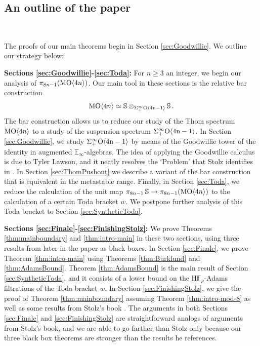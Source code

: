 \subsection{An outline of the paper}
\label{subsec:sketch}\ 

The proofs of our main theorems begin in Section \ref{sec:Goodwillie}.  We outline our strategy below:

\vspace{1ex}
\noindent \textbf{Sections \ref{sec:Goodwillie}-\ref{sec:Toda}:}
For $n \ge 3$ an integer, we begin our analysis of $\pi_{8n-1}(\operatorname{\mathrm{MO}} \langle 4n \rangle)$.  Our main tool in these sections is the relative bar construction
$$\operatorname{\mathrm{MO}} \langle 4n \rangle \simeq \operatorname{\mathbb{S}} \otimes_{\Sigma^{\infty}_+ \mathrm{O \langle 4n-1\rangle}} \operatorname{\mathbb{S}}.$$
The bar construction allows us to reduce our study of the Thom spectrum $\operatorname{\mathrm{MO}} \langle 4n \rangle$ to a study of the suspension spectrum $\Sigma^{\infty}_+ \mathrm{O \langle 4n-1\rangle}$.  In Section \ref{sec:Goodwillie}, we study $\Sigma^{\infty}_+ \mathrm{O \langle 4n-1\rangle}$ by means of the Goodwillie tower of the identity in augmented $\mathbb{E}_\infty$-algebras.  The idea of applying the Goodwillie calculus is due to Tyler Lawson, and it neatly resolves the `Problem' that Stolz identifies in \cite[p. XIII]{StolzBook}.  In Section \ref{sec:ThomPushout} we describe a variant of the bar construction that is equivalent in the metastable range.  Finally, in Section \ref{sec:Toda}, we reduce the calculation of the unit map $\pi_{8n-1} \operatorname{\mathbb{S}} \to \pi_{8n-1}(\operatorname{\mathrm{MO}} \langle 4n \rangle)$ to the calculation of a certain Toda bracket $w$.  We postpone further analysis of this Toda bracket to Section \ref{sec:SyntheticToda}.

\vspace{1ex}
\noindent \textbf{Sections \ref{sec:Finale}-\ref{sec:FinishingStolz}:} We prove Theorems \ref{thm:mainboundary} and \ref{thm:intro-main} in these two sections, using three results from later in the paper as black boxes.  In Section \ref{sec:Finale}, we prove Theorem \ref{thm:intro-main} using Theorems \ref{thm:Burklund} and \ref{thm:AdamsBound}.  Theorem \ref{thm:AdamsBound} is the main result of Section \ref{sec:SyntheticToda}, and it consists of a lower bound on the $\mathrm{H}\mathbb{F}_p$-Adams filtrations of the Toda bracket $w$.  In Section \ref{sec:FinishingStolz}, we give the proof of Theorem \ref{thm:mainboundary} assuming Theorem \ref{thm:intro-mod-8} as well as some results from Stolz's book \cite{StolzBook}.  The arguments in both Sections \ref{sec:Finale} and \ref{sec:FinishingStolz} are straightforward analogs of arguments from Stolz's book, and we are able to go farther than Stolz only because our three black box theorems are stronger than the results he references.

